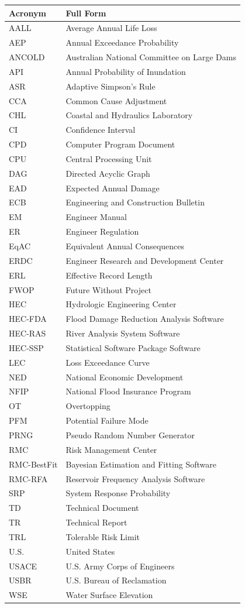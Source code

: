 \documentclass[
]{book}
\begin{document}
\begin{longtable}[]{@{}ll@{}}
\toprule()
Acronym & Full Form \\
\midrule()
\endhead
AALL & Average Annual Life Loss \\
AEP & Annual Exceedance Probability \\
ANCOLD & Australian National Committee on Large Dams \\
API & Annual Probability of Inundation \\
ASR & Adaptive Simpson's Rule \\
CCA & Common Cause Adjustment \\
CHL & Coastal and Hydraulics Laboratory \\
CI & Confidence Interval \\
CPD & Computer Program Document \\
CPU & Central Processing Unit \\
DAG & Directed Acyclic Graph \\
EAD & Expected Annual Damage \\
ECB & Engineering and Construction Bulletin \\
EM & Engineer Manual \\
ER & Engineer Regulation \\
EqAC & Equivalent Annual Consequences \\
ERDC & Engineer Research and Development Center \\
ERL & Effective Record Length \\
FWOP & Future Without Project \\
HEC & Hydrologic Engineering Center \\
HEC-FDA & Flood Damage Reduction Analysis Software \\
HEC-RAS & River Analysis System Software \\
HEC-SSP & Statistical Software Package Software \\
LEC & Loss Exceedance Curve \\
NED & National Economic Development \\
NFIP & National Flood Insurance Program \\
OT & Overtopping \\
PFM & Potential Failure Mode \\
PRNG & Pseudo Random Number Generator \\
RMC & Risk Management Center \\
RMC-BestFit & Bayesian Estimation and Fitting Software \\
RMC-RFA & Reservoir Frequency Analysis Software \\
SRP & System Response Probability \\
TD & Technical Document \\
TR & Technical Report \\
TRL & Tolerable Risk Limit \\
U.S. & United States \\
USACE & U.S. Army Corps of Engineers \\
USBR & U.S. Bureau of Reclamation \\
WSE & Water Surface Elevation \\
\bottomrule()
\end{longtable}

  
\end{document}

